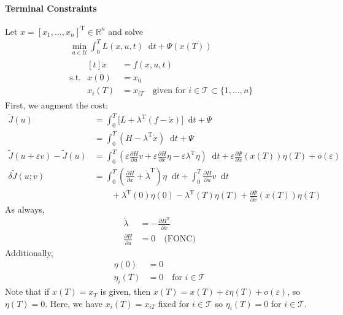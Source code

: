 \documentclass[letterpaper,12pt,titlepage]{report}
\newcommand*\dif{\mathop{}\!\mathrm{d}}
\newcommand{\trans}{^\text{T}}
\newcommand*\pder[2]{\frac{\partial #1}{\partial #2}}
\newcommand*\R{\mathbb{R}}
\theoremstyle{plain}
\theoremstyle{definition}
\begin{document}
\paragraph{Terminal Constraints} \mbox{}

Let $x=[x_1,\dots,x_n]\trans\in\R^n$ and solve
\begin{align}
  & \min_{u\in\mathcal U} \int_0^T L(x,u,t)\dif t + \Psi(x(T)) \\
  & \text{s.t. } \begin{aligned}[t]
    \dot x &= f(x,u,t) \\
    x(0) &= x_0 \\
    x_i(T) &= x_{iT} \quad \text{given for } i\in\mathcal T \subset \{1,\dots,n\}
  \end{aligned}
\end{align}
First, we augment the cost:
\begin{align}
  \tilde J(u) &= \int_0^T \big[ L + \lambda\trans (f-\dot x) \big] \dif t + \Psi \\
              &= \int_0^T (H-\lambda\trans\dot x) \dif t + \Psi \\
  \tilde J (u+\varepsilon v) - \tilde J(u) &= \int_0^T \left( \varepsilon\pder{H}{u} v + \varepsilon\pder{H}{x}\eta - \varepsilon\lambda\trans\dot\eta \right) \dif t + \varepsilon\pder{\Psi}{x}(x(T))\eta(T) + o(\varepsilon) \\
  \delta\tilde J(u;v) &= \int_0^T \left( \pder{H}{x} + \dot\lambda\trans \right)\eta\dif t + \int_0^T \pder{H}{u}v\dif t \\
              & \qquad + \lambda\trans(0)\eta(0) - \lambda\trans(T)\eta(T) + \pder{\Psi}{x}(x(T))\eta(T)
\end{align}
As always,
\begin{align}
  \dot\lambda &= -\pder{H\trans}{x} \\
  \pder{H}{u} &= 0 \quad \text{(FONC)}
\end{align}
Additionally,
\begin{align}
  \eta(0) &= 0 \\
  \eta_i(T) &= 0 \quad \text{for } i\in\mathcal T
\end{align}
Note that if $x(T)=x_T$ is given, then $x(T)=x(T)+\varepsilon\eta(T)+o(\varepsilon)$, so $\eta(T)=0$. Here, we have $x_i(T)=x_{iT}$ fixed for $i\in\mathcal T$ so $\eta_i(T)=0$ for $i\in\mathcal T$.
\end{document}
